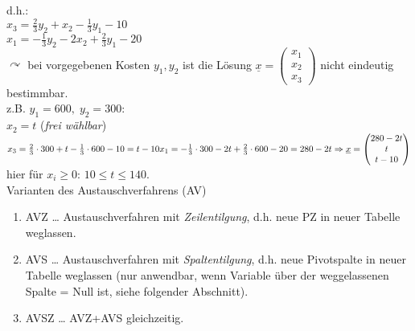 d.h.:\\
$x_3=\frac{2}{3}y_2 + x_2 - \frac{1}{3}y_1 - 10$\\
$x_1=-\frac{1}{3} y_2 - 2x_2 + \frac{2}{3}y_1-20$\\
$\curvearrowright$ bei vorgegebenen Kosten $y_1, y_2$ ist die Lösung $\underline{x}=\begin{pmatrix}
x_1\\x_2\\x_3
\end{pmatrix}$ nicht eindeutig bestimmbar.\\
 z.B. $y_1=600,\; y_2=300$:\\
$x_2=t$ (\emph{frei wählbar})\\
$x_3=\frac{2}{3}\cdot 300 + t - \frac{1}{3}\cdot 600 -10 = t-10\\
x_1=-\frac{1}{3}\cdot 300 - 2t + \frac{2}{3}\cdot 600 -20=280-2t\\
\Rightarrow \underline{x}=\begin{pmatrix}
280-2t\\
t\\
t-10
\end{pmatrix}$\\
hier für $x_i\geq 0$: $10\leq t \leq 140$.
\bigskip\\
Varianten des Austauschverfahrens (AV)
\begin{enumerate}
\item AVZ … Austauschverfahren mit \emph{Zeilentilgung}, d.h. neue PZ in neuer Tabelle weglassen.
\item AVS … Austauschverfahren mit \emph{Spaltentilgung}, d.h. neue Pivotspalte in neuer Tabelle weglassen (nur anwendbar, wenn Variable über der weggelassenen Spalte = Null ist, siehe folgender Abschnitt).
\item AVSZ … AVZ+AVS gleichzeitig.
\end{enumerate}

